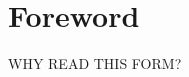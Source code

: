 \onecolumn

\chapter*{Foreword}

\begingroup \fontsize{12pt}{11pt}\selectfont

WHY READ THIS FORM?

\endgroup
\clearpage
